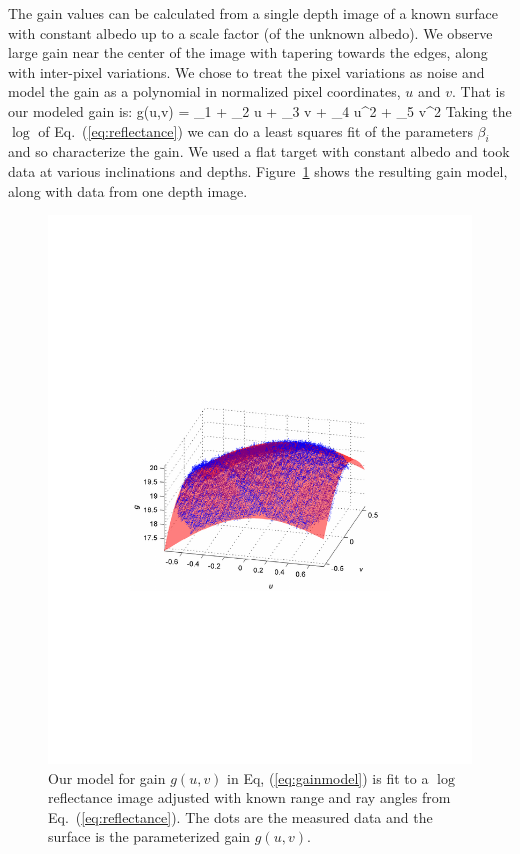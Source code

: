 The gain values can be calculated from a single depth image of a known surface with constant albedo up to a scale factor (of the unknown albedo).  We observe large gain near the center of the image with tapering towards the edges, along with inter-pixel variations.  We chose to treat the pixel variations as noise and model the gain as a polynomial in normalized pixel coordinates, $u$ and $v$.  That is our modeled gain is:
\beq
g(u,v) = \beta_1 + \beta_2 u + \beta_3 v + \beta_4 u^2 + \beta_5 v^2 \label{eq:gainmodel}
\eeq
Taking the $\log$ of Eq.~(\ref{eq:reflectance}) we can do a least squares fit of the parameters $\beta_i$ and so characterize the gain.  We used a flat target with constant albedo and took data at various inclinations and depths. Figure~\ref{fig:gain} shows the resulting gain model, along with data from one depth image.   

\begin{figure}
\begin{center}
   \includegraphics[trim=100 250 100 250,clip,width=0.95\linewidth]{Figures/gain}
\end{center}
   \caption{Our model for gain $g(u,v)$ in Eq, (\ref{eq:gainmodel}) is fit to a $\log$ reflectance image adjusted with known range and ray angles from Eq.~(\ref{eq:reflectance}).  The dots are the measured data and the surface is the parameterized gain $g(u,v)$. }
\label{fig:gain}
\end{figure}



